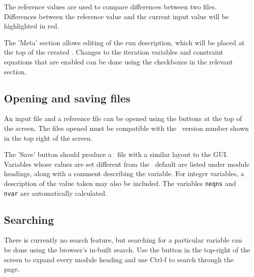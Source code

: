 The reference values are used to compare differences between two files.
Differences between the reference value and the current input value will be
highlighted in red.

The 'Meta' section allows editing of the run description, which will be placed
at the top of the created \indat. Changes to the iteration variables and
constraint equations that are enabled can be done using the checkboxes in the
relevant section.

\subsection{Opening and saving files}
An input file and a reference file can be opened using the buttons at the top
of the screen. The files opened must be compatible with the \process\ version
number shown in the top right of the screen.

The 'Save' button should produce a \indat\ file with a similar
layout to the GUI. Variables whose values are set different from the
\process\ default are listed under module headings, along with a comment
describing the variable. For integer variables, a description of the value
taken may also be included. The variables \texttt{neqns} and \texttt{nvar} are automatically
calculated.

\subsection{Searching}
There is currently no search feature, but searching for a particular
variable can be done using the browser's in-built search. Use the button
in the top-right of the screen to expand every module heading and use Ctrl-f
to search through the page.

